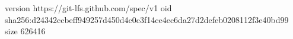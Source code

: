 version https://git-lfs.github.com/spec/v1
oid sha256:d24342ccbeff949257d450d4c0c3f14ce4ec6da27d2defeb0208112f3e40bd99
size 626416
